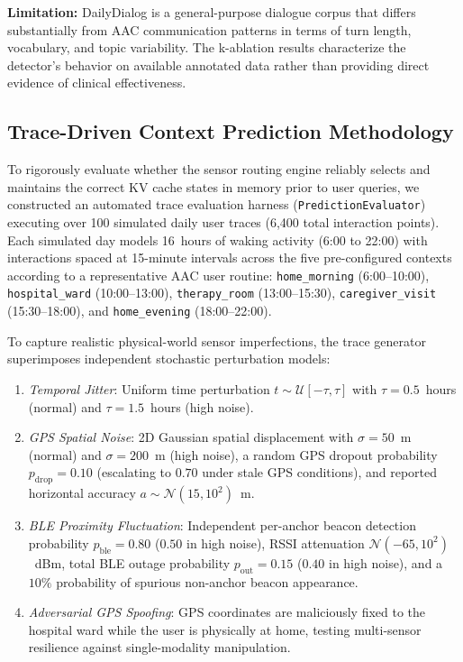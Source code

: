 \documentclass[journal]{IEEEtran}
\begin{document}
\textbf{Limitation:} DailyDialog is a general-purpose dialogue corpus that differs substantially from AAC communication patterns in terms of turn length, vocabulary, and topic variability. The k-ablation results characterize the detector's behavior on available annotated data rather than providing direct evidence of clinical effectiveness.

\subsection{Trace-Driven Context Prediction Methodology}
\label{sec:trace_eval_method}

To rigorously evaluate whether the sensor routing engine reliably selects and maintains the correct KV cache states in memory prior to user queries, we constructed an automated trace evaluation harness (\texttt{PredictionEvaluator}) executing over 100 simulated daily user traces (6,400 total interaction points). Each simulated day models 16~hours of waking activity (6:00 to 22:00) with interactions spaced at 15-minute intervals across the five pre-configured contexts according to a representative AAC user routine: \texttt{home\_morning} (6:00--10:00), \texttt{hospital\_ward} (10:00--13:00), \texttt{therapy\_room} (13:00--15:30), \texttt{caregiver\_visit} (15:30--18:00), and \texttt{home\_evening} (18:00--22:00).

To capture realistic physical-world sensor imperfections, the trace generator superimposes independent stochastic perturbation models:
\begin{enumerate}
    \item \emph{Temporal Jitter}: Uniform time perturbation $t \sim \mathcal{U}[-\tau, \tau]$ with $\tau = 0.5$~hours (normal) and $\tau = 1.5$~hours (high noise).
    \item \emph{GPS Spatial Noise}: 2D Gaussian spatial displacement with $\sigma = 50$~m (normal) and $\sigma = 200$~m (high noise), a random GPS dropout probability $p_{\text{drop}} = 0.10$ (escalating to $0.70$ under stale GPS conditions), and reported horizontal accuracy $a \sim \mathcal{N}(15, 10^2)$~m.
    \item \emph{BLE Proximity Fluctuation}: Independent per-anchor beacon detection probability $p_{\text{ble}} = 0.80$ ($0.50$ in high noise), RSSI attenuation $\mathcal{N}(-65, 10^2)$~dBm, total BLE outage probability $p_{\text{out}} = 0.15$ ($0.40$ in high noise), and a $10\%$ probability of spurious non-anchor beacon appearance.
    \item \emph{Adversarial GPS Spoofing}: GPS coordinates are maliciously fixed to the hospital ward while the user is physically at home, testing multi-sensor resilience against single-modality manipulation.
\end{enumerate}
\end{document}
